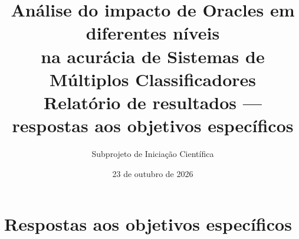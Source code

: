 \documentclass[11pt,a4paper]{article}
\title{\bfseries Análise do impacto de Oracles em diferentes níveis\\
na acurácia de Sistemas de Múltiplos Classificadores\\[0.4em]
\large Relatório de resultados --- respostas aos objetivos específicos}
\author{Subprojeto de Iniciação Científica}
\date{23 de outubro de 2026}
\begin{document}
\maketitle



\tableofcontents
\bigskip




\section{Respostas aos objetivos específicos}
















\end{document}

